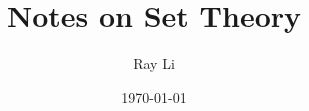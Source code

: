 \documentclass[10pt]{article}
\title{Notes on Set Theory}
\author{Ray Li}
\date{\today}
\begin{document}
\maketitle

\tableofcontents
\newpage\

% 








\end{document}
